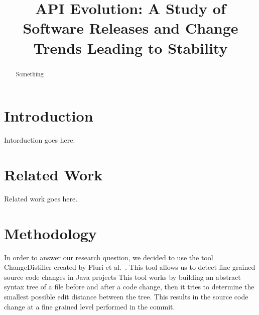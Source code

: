 \documentclass[conference]{IEEEtran}
\begin{document}
\title{API Evolution: A Study of Software Releases and Change Trends Leading to Stability}

\author{
\and
{}
\and
{}
}

\maketitle

\begin{abstract}
Something
\end{abstract}

\section{Introduction}
Intorduction goes here.

\section{Related Work}
Related work goes here.

\section{Methodology}
In order to answer our research question, we decided to use the tool ChangeDistiller created by Fluri et al.~\cite{Fluri:2007:CDT}. This tool allows us to detect fine grained
source code changes in Java projects This tool works by building an abstract syntax tree of a file before and after a code change, then it tries to determine
the smallest possible edit distance between the tree. This results in the source code change at a fine grained level performed in the commit.
\end{document}

